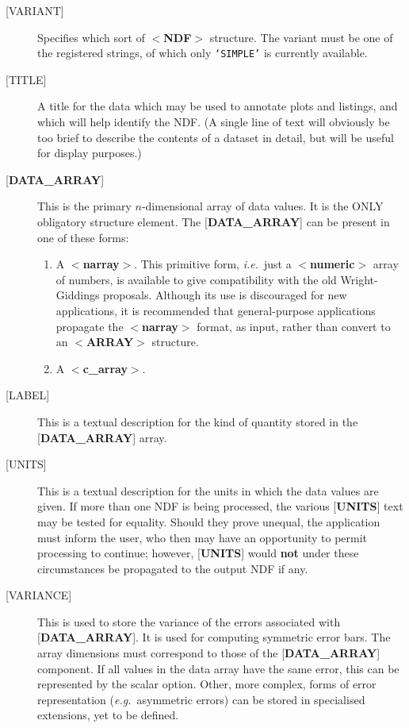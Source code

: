 \documentclass[twoside,11pt]{article}
\begin{document}
\begin{description}
\item [{[}VARIANT{]}]  Specifies which
sort of $<${\bf NDF}$>$ structure.  The variant
must be one
of the registered strings, of which only {\tt `SIMPLE'} is currently 
available.
\item [{[}TITLE{]}]  A title for the data which
may be used to annotate plots and
listings, and which will help identify the NDF.
(A single line of text will obviously be too
brief to describe the contents
of a dataset in detail, but will
be useful for display purposes.)
\item [{[}{\bf DATA\_ARRAY}{]}]  This is the primary
$n$-dimensional array of data values.
It is the ONLY obligatory structure element.  The
{[}{\bf DATA\_ARRAY}{]} can be 
present in one of these forms:
\begin{enumerate}
\item A $<${\bf narray}$>$.
This primitive form, {\it i.e.}\ just a $<${\bf numeric}$>$ array of numbers,
is available to give compatibility with the old Wright-Giddings proposals.
Although its
use is discouraged for new applications, it
is recommended that general-purpose applications
propagate the $<${\bf narray}$>$ format, as input,
rather than convert to an
\mbox{$<${\bf ARRAY}$>$} structure.
\item A $<${\bf c\_array}$>$.
\end{enumerate}
\item [{[}LABEL{]}]  This is a textual description for the kind of quantity
stored in the {[}{\bf DATA\_ARRAY}{]} array.
\item [{[}UNITS{]}]  This is a textual description for the units in which the
data values are given. If more than one NDF is being processed, the various
{[}{\bf UNITS}{]} text may be tested for equality.  Should they prove
unequal, the
application must inform the user, who then may have an opportunity to 
permit processing to continue;  however, {[}{\bf UNITS}{]}
would {\bf not} under these circumstances be
propagated to the output NDF if any.
\item [{[}VARIANCE{]}]  This is used to store the variance of the
errors associated with {[}{\bf DATA\_ARRAY}{]}.
It is used for computing symmetric error bars.
The array dimensions must correspond to those of the
{[}{\bf DATA\_ARRAY}{]} component.
If all values in the data array have the same error, this can
be represented by the scalar option. 
Other, more complex, forms of error representation
({\it e.g.}\  asymmetric errors)
can be stored in specialised extensions, yet to be defined.

\end{description}
\end{document}
